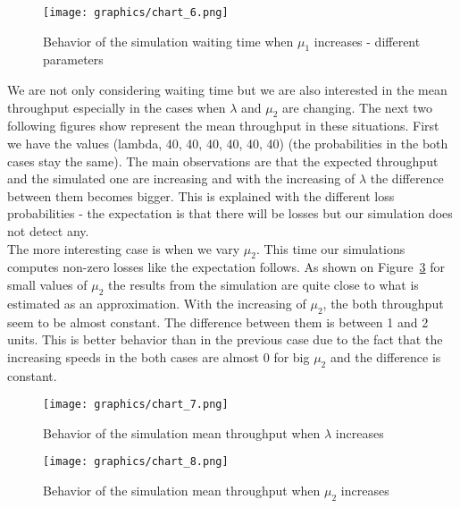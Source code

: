 \documentclass[12pt]{article}
\theoremstyle{plain}
\begin{document}
\begin{figure}
  \caption{Behavior of the simulation waiting time when $\mu_1$ increases - different parameters}
  \texttt{[image: graphics/chart\_6.png]}\\
  \label{fig:waiting_time2}
\end{figure}

We are not only considering waiting time but we are also interested in the mean
throughput especially in the cases when $\lambda$ and $\mu_2$ are changing.
The next two following figures show represent the mean throughput in these situations.
First we have the values (lambda, 40, 40, 40, 40, 40, 40) (the probabilities in
the both cases stay the same). The main observations are that the expected throughput
and the simulated one are increasing and with the increasing of $\lambda$ the
difference between them becomes bigger. This is explained with the different loss
probabilities - the expectation is that there will be losses but our simulation
does not detect any.\\
The more interesting case is when we vary $\mu_2$. This time our simulations
computes non-zero losses like the expectation follows. As shown on Figure~\ref{fig:throughput2}
for small values of $\mu_2$ the results from the simulation are quite close to
what is estimated as an approximation. With the increasing of $\mu_2$, the both
throughput seem to be almost constant. The difference between them is between 1
and 2 units. This is better behavior than in the previous case due to the fact
that the increasing speeds in the both cases are almost 0 for big $\mu_2$ and the
difference is constant.\\

\begin{figure}
  \caption{Behavior of the simulation mean throughput when $\lambda$ increases}
  \texttt{[image: graphics/chart\_7.png]}\\
  \label{fig:throughput1}
\end{figure}

\begin{figure}
  \caption{Behavior of the simulation mean throughput when $\mu_2$ increases}
  \texttt{[image: graphics/chart\_8.png]}\\
  \label{fig:throughput2}
\end{figure}
\end{document}
